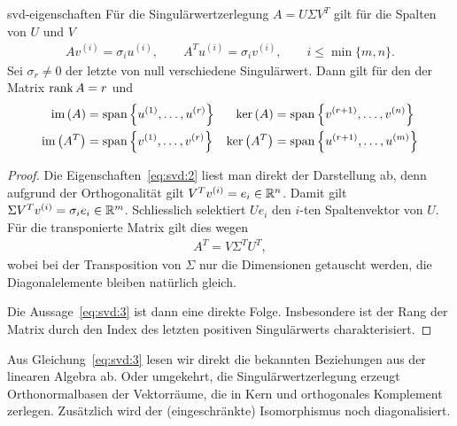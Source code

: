 \begin{Lemma}{svd-eigenschaften}
  Für die Singulärwertzerlegung $A=U\Sigma V^T$ gilt für die Spalten
  von $U$ und $V$
  \begin{gather}
    \label{eq:svd:2}
    A v^{(i)} = \sigma_i u^{(i)}, \qquad
    A^T u^{(i)} = \sigma_i v^{(i)},\qquad
    i \le \min\{m,n\}.
  \end{gather}
  Sei $\sigma_r\neq0$ der letzte von null verschiedene
  Singulärwert. Dann gilt für den  der Matrix $\operatorname{rank} A = r$
  und
  \begin{gather}
    \label{eq:svd:3}
    \begin{aligned}
      \operatorname{im}\left(A\right) &= \operatorname{span}\left\{u^{(1)},\dots,u^{(r)}\right\}&
      \operatorname{ker}\left(A\right) &= \operatorname{span}\left\{v^{(r+1)},\dots,v^{(n)}\right\}\\
      \operatorname{im}\left(A^T\right) &= \operatorname{span}\left\{v^{(1)},\dots,v^{(r)}\right\}&
      \operatorname{ker}\left(A^T\right) &= \operatorname{span}\left\{u^{(r+1)},\dots,u^{(m)}\right\}
    \end{aligned}
  \end{gather}
\end{Lemma}

\begin{proof}
  Die Eigenschaften~\eqref{eq:svd:2} liest man direkt der Darstellung
  ab, denn aufgrund der Orthogonalität gilt
  $V^T v^{(i)} = e_i \in \mathbb R^n$. Damit gilt
  $\Sigma V^Tv^{(i)} = \sigma_i e_i \in \mathbb R^m$. Schliesslich selektiert
  $Ue_i$ den $i$-ten Spaltenvektor von $U$. Für die transponierte
  Matrix gilt dies wegen
  \begin{gather}
    A^T = V \Sigma^T U^T,
  \end{gather}
  wobei bei der Transposition von $\Sigma$ nur die Dimensionen
  getauscht werden, die Diagonalelemente bleiben natürlich gleich.

  Die Aussage~\eqref{eq:svd:3} ist dann eine direkte
  Folge. Insbesondere ist der Rang der Matrix durch den Index des
  letzten positiven Singulärwerts charakterisiert.
\end{proof}

\begin{remark}
  Aus Gleichung~\eqref{eq:svd:3} lesen wir direkt die bekannten
  Beziehungen aus der linearen Algebra ab. Oder umgekehrt, die
  Singulärwertzerlegung erzeugt Orthonormalbasen der Vektorräume, die
  in Kern und orthogonales Komplement zerlegen. Zusätzlich wird der
  (eingeschränkte) Isomorphismus noch diagonalisiert.
\end{remark}

